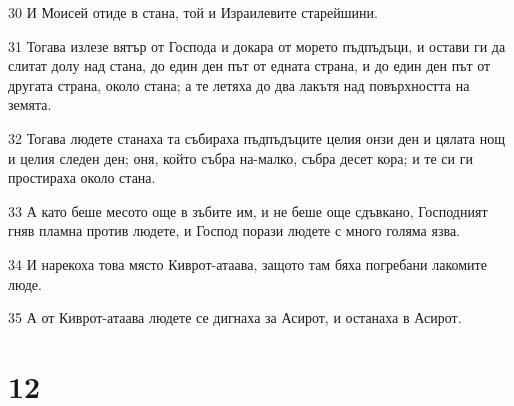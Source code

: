 \par 30 И Моисей отиде в стана, той и Израилевите старейшини.
\par 31 Тогава излезе вятър от Господа и докара от морето пъдпъдъци, и остави ги да слитат долу над стана, до един ден път от едната страна, и до един ден път от другата страна, около стана; а те летяха до два лакътя над повърхността на земята.
\par 32 Тогава людете станаха та събираха пъдпъдъците целия онзи ден и цялата нощ и целия следен ден; оня, който събра на-малко, събра десет кора; и те си ги простираха около стана.
\par 33 А като беше месото още в зъбите им, и не беше още сдъвкано, Господният гняв пламна против людете, и Господ порази людете с много голяма язва.
\par 34 И нарекоха това място Киврот-атаава, защото там бяха погребани лакомите люде.
\par 35 А от Киврот-атаава людете се дигнаха за Асирот, и останаха в Асирот.

\chapter{12}

